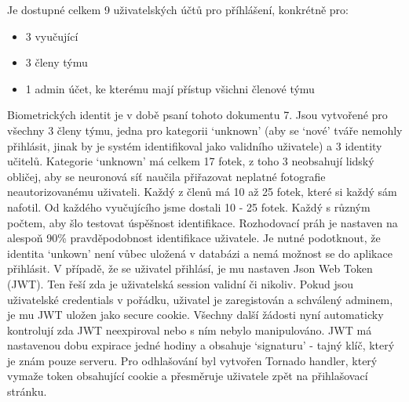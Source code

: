 Je dostupné celkem 9 uživatelských účtů pro příhlášení, konkrétně pro: 
\begin{itemize}
    \item 3 vyučující%
    \item 3 členy týmu
    \item 1 admin účet, ke kterému mají přístup všichni členové týmu
\end{itemize}
Biometrických identit je v době psaní tohoto dokumentu 7. Jsou vytvořené pro všechny 3 členy týmu, jedna pro kategorii `unknown' (aby se `nové' tváře nemohly přihlásit, jinak by je systém identifikoval jako validního uživatele) a 3 identity učitelů. 
Kategorie `unknown' má celkem 17 fotek, z toho 3 neobsahují lidský obličej, aby se neuronová síť naučila přiřazovat neplatné fotografie neautorizovanému uživateli.
Každý z členů má 10 až 25 fotek, které si každý sám nafotil.
Od každého vyučujícího jsme dostali 10 - 25 fotek. Každý s různým počtem, aby šlo testovat úspěšnost identifikace.
Rozhodovací práh je nastaven na alespoň 90\% pravděpodobnost identifikace uživatele. 
Je nutné podotknout, že identita `unkown' není vůbec uložená v databázi a nemá možnost se do aplikace přihlásit.
V případě, že se uživatel přihlásí, je mu nastaven Json Web Token (JWT). Ten řeší zda je uživatelská session validní či nikoliv.
Pokud jsou uživatelské credentials v pořádku, uživatel je zaregistován a schválený adminem, je mu JWT uložen jako secure cookie.
Všechny další žádosti nyní automaticky kontrolují zda JWT neexpiroval nebo s ním nebylo manipulováno. 
JWT má nastavenou dobu expirace jedné hodiny a obsahuje `signaturu' - tajný klíč, který je znám pouze serveru.  
Pro odhlašování byl vytvořen Tornado handler, který vymaže token obsahující cookie a přesměruje uživatele zpět na přihlašovací stránku.